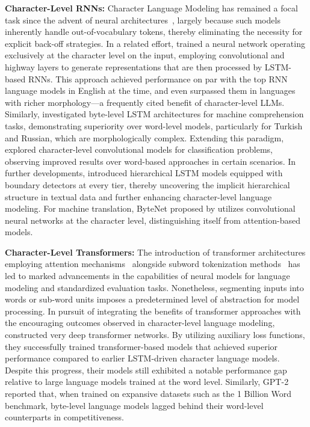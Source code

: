 \textbf{Character-Level RNNs:} Character Language Modeling has remained a focal task since the advent of neural architectures~\citep{sutskever2011generating,mikolov2012subword,graves2013generating}, largely because such models inherently handle out-of-vocabulary tokens, thereby eliminating the necessity for explicit back-off strategies. In a related effort, \cite{kim2016character} trained a neural network operating exclusively at the character level on the input, employing convolutional and highway layers to generate representations that are then processed by LSTM-based RNNs. This approach achieved performance on par with the top RNN language models in English at the time, and even surpassed them in languages with richer morphology—a frequently cited benefit of character-level LLMs. Similarly, \cite{kenter2018byte} investigated byte-level LSTM architectures for machine comprehension tasks, demonstrating superiority over word-level models, particularly for Turkish and Russian, which are morphologically complex. Extending this paradigm, \cite{zhang2015character} explored character-level convolutional models for classification problems, observing improved results over word-based approaches in certain scenarios. In further developments, \citet{chung2019hierarchical} introduced hierarchical LSTM models equipped with boundary detectors at every tier, thereby uncovering the implicit hierarchical structure in textual data and further enhancing character-level language modeling. For machine translation, ByteNet proposed by \cite{kalchbrenner2016neural} utilizes convolutional neural networks at the character level, distinguishing itself from attention-based models.

\textbf{Character-Level Transformers:} The introduction of transformer architectures employing attention mechanisms~\citep{vaswani2017attention} alongside subword tokenization methods~\citep{sennrich-etal-2016-neural} has led to marked advancements in the capabilities of neural models for language modeling and standardized evaluation tasks. Nonetheless, segmenting inputs into words or sub-word units imposes a predetermined level of abstraction for model processing. In pursuit of integrating the benefits of transformer approaches with the encouraging outcomes observed in character-level language modeling, \citet{al2019character} constructed very deep transformer networks. By utilizing auxiliary loss functions, they successfully trained transformer-based models that achieved superior performance compared to earlier LSTM-driven character language models. Despite this progress, their models still exhibited a notable performance gap relative to large language models trained at the word level. Similarly, GPT-2~\citep{radfordgpt2} reported that, when trained on expansive datasets such as the 1 Billion Word benchmark, byte-level language models lagged behind their word-level counterparts in competitiveness.

